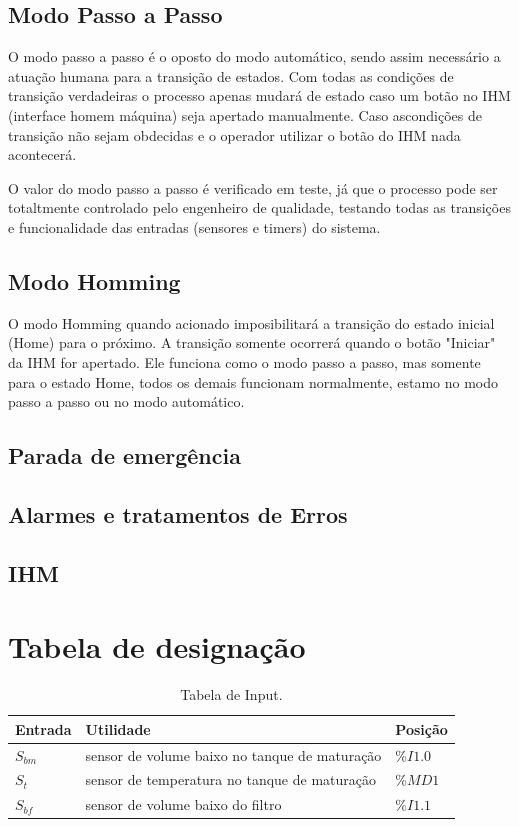 \documentclass[12pt]{article}
\begin{document}
	\subsection{Modo Passo a Passo}
	
	O modo passo a passo é o oposto do modo automático, sendo assim necessário a atuação humana para a transição de estados. Com todas as condições de transição verdadeiras o processo apenas mudará de estado caso um botão no IHM (interface homem máquina) seja apertado manualmente. Caso ascondições de transição não sejam obdecidas e o operador utilizar o botão do IHM nada acontecerá.
	
	O valor do modo passo a passo é verificado em teste, já que o processo pode ser totaltmente controlado pelo engenheiro de qualidade, testando todas as transições e funcionalidade das entradas (sensores e timers) do sistema.
	
	\subsection{Modo Homming}
	
	O modo Homming quando acionado imposibilitará a transição do estado inicial (Home) para o próximo. A transição somente ocorrerá quando o botão "Iniciar" da IHM for apertado. Ele funciona como o modo passo a passo, mas somente para o estado Home, todos os demais funcionam normalmente, estamo no modo passo a passo ou no modo automático.
	
	\subsection{Parada de emergência}
	
	
	\subsection{Alarmes e tratamentos de Erros}
	
	
	\subsection{IHM}

\section {Tabela de designação}
\begin{table}[H]
	\caption{Tabela de Input.}
	\centering
	\begin{tabular}{|  p{2cm} | p{10cm} | p{2cm} | }
		\hline
		Entrada & Utilidade & Posição\\
		\hline
		$S_{bm}$ & sensor de volume baixo no tanque de maturação & $\%I1.0$ \\
		$S_t$ & sensor de temperatura no tanque de maturação & $\%MD1$ \\
		$S_{bf}$ & sensor de volume baixo do filtro & $\%I1.1$ \\
		\hline
	\end{tabular}
\end{table}
\end{document}
